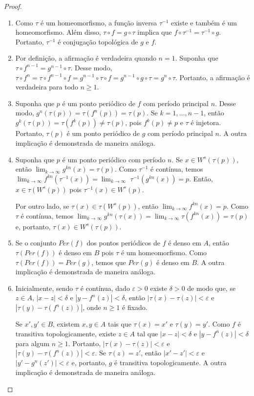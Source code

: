 \documentclass[a4paper, 12pt]{article}
\theoremstyle{definition}
\theoremstyle{plain}
\theoremstyle{plain}
\theoremstyle{plain}
\theoremstyle{definition}
\theoremstyle{remark}
\begin{document}
\begin{proof}
\begin{enumerate}
\item Como $\tau$ é um homeomorfismo, a função inversa $\tau^{-1}$ existe e também é um homeomorfismo. Além disso, $\tau \circ f = g \circ \tau$ implica que $f \circ \tau^{-1} = \tau^{-1} \circ g$. Portanto, $\tau^{-1}$ é conjugação topológica de $g$ e $f$.
\item Por definição, a afirmação é verdadeira quando $n = 1$. Suponha que $\tau \circ f^{n-1} = g^{n-1} \circ \tau$. Desse modo, $\tau \circ f^n = \tau \circ f^{n-1} \circ f = g^{n-1} \circ \tau \circ f = g^{n-1} \circ g \circ  \tau = g^n \circ \tau$. Portanto, a afirmação é verdadeira para todo $n \geq 1$.
\item Suponha que $p$ é um ponto periódico de $f$ com período principal $n$. Desse modo, $g^n(\tau(p)) = \tau(f^n(p)) = \tau(p)$. Se $k = 1, \dots, n-1$, então $g^k(\tau(p)) = \tau(f^k(p)) \neq \tau(p)$, pois $f^k(p) \neq p$ e $\tau$ é injetora. Portanto, $\tau(p)$ é um ponto periódico de $g$ com período principal $n$. A outra implicação é demonstrada de maneira análoga.
\item Suponha que $p$ é um ponto periódico com período $n$. Se $x \in W^s(\tau(p))$, então $\lim_{k \to \infty} g^{kn}(x) = \tau(p)$. Como $\tau^{-1}$ é contínua, temos $\lim_{k \to \infty} f^{kn}(\tau^{-1}(x)) = \lim_{k \to \infty} $ $ \tau^{-1}(g^{kn}(x))= p$. Então,  $x \in \tau(W^s(p))$ pois $\tau^{-1}(x) \in W^s(p)$.

Por outro lado, se $\tau(x) \in \tau(W^s(p))$, então $\lim_{k \to \infty} f^{kn}(x) = p$. Como $\tau$ é contínua, temos $\lim_{k \to \infty} g^{kn}(\tau(x)) = \lim_{k \to \infty} \tau(f^{kn}(x)) = \tau(p)$ e, portanto, $\tau(x) \in W^s(\tau(p))$.
\item Se o conjunto $Per(f)$ dos pontos periódicos de $f$ é denso em $A$, então $\tau(Per(f))$ é denso em $B$ pois $\tau$ é um homeomorfismo. Como $\tau(Per(f)) = Per(g)$, temos que $Per(g)$ é denso em $B$. A outra implicação é demonstrada de maneira análoga.
\item Inicialmente, sendo $\tau$ é contínua, dado $\varepsilon > 0$ existe $\delta > 0$ de modo que, se $z \in A$, $|x - z| < \delta$ e $|y - f^n(z)| < \delta$, então $|\tau(x) - \tau(z)| < \varepsilon$ e $|\tau(y) - \tau(f^n(z))|$, onde $n \geq 1$ é fixado.

Se $x', y' \in B$, existem $x, y \in A$ tais que $\tau(x) = x'$ e $\tau(y) =  y'$. Como $f$ é transitiva topologicamente, existe $z \in A$ tal que $|x - z| < \delta$ e $|y - f^n(z)| < \delta$ para algum $n \geq 1$. Portanto, $|\tau(x) - \tau(z)| < \varepsilon$ e $|\tau(y) - \tau(f^n(z))| < \varepsilon$. Se $\tau(z) = z'$, então $|x' - z'| < \varepsilon$ e $|y' - g^n(z')| < \varepsilon$ e, portanto, $g$ é transitiva topologicamente. A outra implicação é demonstrada de maneira análoga.
\end{enumerate}
\end{proof}
\end{document}
